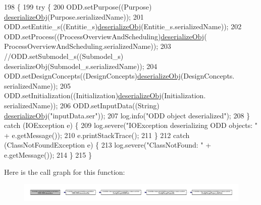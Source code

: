 \begin{DoxyCode}
198                                     \{
199         \textcolor{keywordflow}{try} \{
200             ODD.setPurpose((Purpose) \hyperlink{classit_1_1isislab_1_1masonassisteddocumentation_1_1_o_d_d_1_1_o_d_d_a75152526b3e9c34426668dd578544240}{deserializeObj}(Purpose.serializedName));
201             ODD.setEntitie\_s((Entitie\_s)\hyperlink{classit_1_1isislab_1_1masonassisteddocumentation_1_1_o_d_d_1_1_o_d_d_a75152526b3e9c34426668dd578544240}{deserializeObj}(Entitie\_s.serializedName));
202             ODD.setProcess((ProcessOverviewAndScheduling)\hyperlink{classit_1_1isislab_1_1masonassisteddocumentation_1_1_o_d_d_1_1_o_d_d_a75152526b3e9c34426668dd578544240}{deserializeObj}(
      ProcessOverviewAndScheduling.serializedName));
203             \textcolor{comment}{//ODD.setSubmodel\_s((Submodel\_s) deserializeObj(Submodel\_s.serializedName));}
204             ODD.setDesignConcepts((DesignConcepts)\hyperlink{classit_1_1isislab_1_1masonassisteddocumentation_1_1_o_d_d_1_1_o_d_d_a75152526b3e9c34426668dd578544240}{deserializeObj}(DesignConcepts.
      serializedName));
205             ODD.setInitialization((Initialization)\hyperlink{classit_1_1isislab_1_1masonassisteddocumentation_1_1_o_d_d_1_1_o_d_d_a75152526b3e9c34426668dd578544240}{deserializeObj}(Initialization.
      serializedName));
206             ODD.setInputData((String) \hyperlink{classit_1_1isislab_1_1masonassisteddocumentation_1_1_o_d_d_1_1_o_d_d_a75152526b3e9c34426668dd578544240}{deserializeObj}(\textcolor{stringliteral}{"inputData.ser"}));
207             log.info(\textcolor{stringliteral}{"ODD object deserialized"});
208         \} \textcolor{keywordflow}{catch} (IOException e) \{
209             log.severe(\textcolor{stringliteral}{"IOException deserializing ODD objects: "} + e.getMessage());
210             e.printStackTrace();
211         \}
212         \textcolor{keywordflow}{catch} (ClassNotFoundException e) \{
213             log.severe(\textcolor{stringliteral}{"ClassNotFound: "} + e.getMessage());
214         \}
215     \}
\end{DoxyCode}


Here is the call graph for this function\-:\nopagebreak
\begin{figure}[H]
\begin{center}
\leavevmode
\includegraphics[width=350pt]{classit_1_1isislab_1_1masonassisteddocumentation_1_1_o_d_d_1_1_o_d_d_ab7b09ee32af669dfb46f6ca1d4d81f3b_cgraph}
\end{center}
\end{figure}


